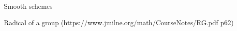 %

\DeclareMathOperator{\Spec}{Spec}
\DeclareMathOperator{\Hom}{Hom}
\newcommand{\C}{{\mathbb C}}
\newcommand{\Gm}{{\mathbb G_m}}

\begin{definition}
  \label{smoothscheme}
  Smooth schemes
\end{definition}

\begin{definition}
  \label{radical}
  Radical of a group (https://www.jmilne.org/math/CourseNotes/RG.pdf p62)
\end{definition}


